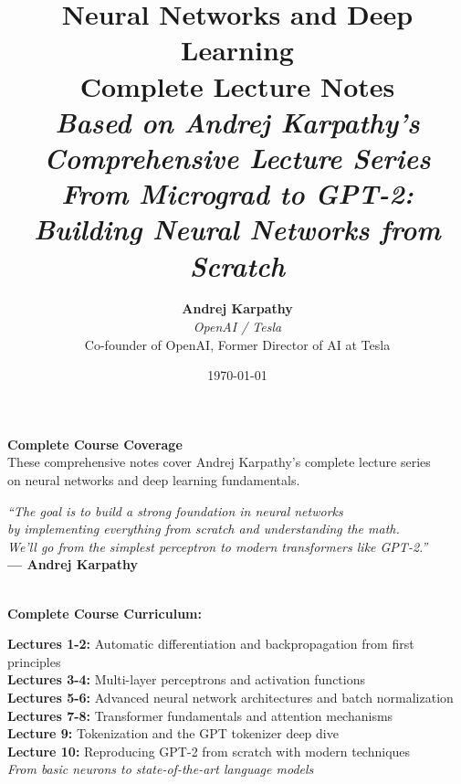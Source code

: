 \documentclass[11pt]{article}
\title{
    \vspace{-0.8in}
    \Huge\textbf{\color{blue!80!black}Neural Networks and Deep Learning}\\[0.3cm]
    \LARGE\textbf{\color{blue!60!black}Complete Lecture Notes}\\[0.5cm]
    \large\textit{Based on Andrej Karpathy's Comprehensive Lecture Series}\\[0.2cm]
    \normalsize\textit{From Micrograd to GPT-2: Building Neural Networks from Scratch}
}
\author{
    \Large\textbf{Andrej Karpathy}\\[0.2cm]
    \large\textit{OpenAI / Tesla}\\[0.1cm]
    \normalsize Co-founder of OpenAI, Former Director of AI at Tesla
}
\date{\Large\today}
\theoremstyle{definition}
\begin{document}
\maketitle
\thispagestyle{empty}

\vfill
\begin{center}
\large
\textbf{\color{blue!70!black}Complete Course Coverage}\\[0.4cm]
\normalsize
These comprehensive notes cover Andrej Karpathy's complete lecture series\\
on neural networks and deep learning fundamentals.\\[0.6cm]

\begin{minipage}{0.8\textwidth}
\centering
\textit{\color{blue!60!black}``The goal is to build a strong foundation in neural networks\\
by implementing everything from scratch and understanding the math.\\
We'll go from the simplest perceptron to modern transformers like GPT-2.''}\\[0.4cm]
\textbf{--- Andrej Karpathy}
\end{minipage}\\[0.8cm]

\textbf{\color{blue!70!black}Complete Course Curriculum:}\\[0.3cm]
\begin{minipage}{0.95\textwidth}
\small
\textbf{Lectures 1-2:} Automatic differentiation and backpropagation from first principles\\
\textbf{Lectures 3-4:} Multi-layer perceptrons and activation functions\\
\textbf{Lectures 5-6:} Advanced neural network architectures and batch normalization\\
\textbf{Lectures 7-8:} Transformer fundamentals and attention mechanisms\\
\textbf{Lecture 9:} Tokenization and the GPT tokenizer deep dive\\
\textbf{Lecture 10:} Reproducing GPT-2 from scratch with modern techniques\\[0.3cm]
\textit{From basic neurons to state-of-the-art language models}
\end{minipage}
\end{center}
\vfill

\newpage

\renewcommand{\contentsname}{\LARGE\textbf{\color{blue!80!black}Table of Contents}}
\setlength{\cftbeforesecskip}{0.8em}
\setlength{\cftbeforesubsecskip}{0.4em}
\renewcommand{\cftsecfont}{\bfseries\color{blue!70!black}}
\renewcommand{\cftsecpagefont}{\bfseries\color{blue!70!black}}
\renewcommand{\cftsubsecfont}{\color{blue!60!black}}
\renewcommand{\cftsubsecpagefont}{\color{blue!60!black}}

\tableofcontents
\newpage











% 
\end{document}
